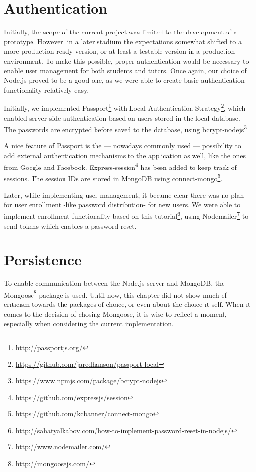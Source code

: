 \section{Authentication}
Initially, the scope of the current project was limited to the development of a
prototype. However, in a later stadium the expectations somewhat shifted to a
more production ready version, or at least a testable version in a production
environment. To make this possible, proper authentication would be necessary to
enable user management for both students and tutors. Once again, our choice of 
Node.js proved to be a good one, as we were able to create basic authentication
functionality relatively easy. 

Initially, we implemented Passport\footnote{\url{http://passportjs.org/}} 
with Local Authentication 
Strategy\footnote{\url{https://github.com/jaredhanson/passport-local}}, 
which enabled server side authentication based on users stored in the local
database. The passwords are encrypted before saved to the database, using
bcrypt-nodejs\footnote{\url{https://www.npmjs.com/package/bcrypt-nodejs}}

A nice feature of Passport is the --- nowadays commonly used --- 
possibility to add external authentication mechanisms to the application as 
well, like the ones from Google and Facebook. 
Express-session\footnote{\url{https://github.com/expressjs/session}}
has been added to keep track of sessions. The session IDs are stored in MongoDB using 
connect-mongo\footnote{\url{https://github.com/kcbanner/connect-mongo}}. 

Later, while implementing user management, it became clear there was no plan for
user enrollment -like password distribution- for new users. We were able to
implement enrollment functionality based on this
tutorial\footnote{\url{http://sahatyalkabov.com/how-to-implement-password-reset-in-nodejs/}},
using Nodemailer\footnote{\url{http://www.nodemailer.com/}} to send tokens
which enables a password reset.

\section{Persistence}
To enable communication between the Node.js server and MongoDB, the 
Mongoose\footnote{\url{http://mongoosejs.com/}}
package is used. Until now, this chapter did not show much of criticism towards 
the packages of choice, or even about the choice it self. When it comes to the 
decision of chosing Mongoose, it is wise to reflect a moment, especially when 
considering the current implementation.

